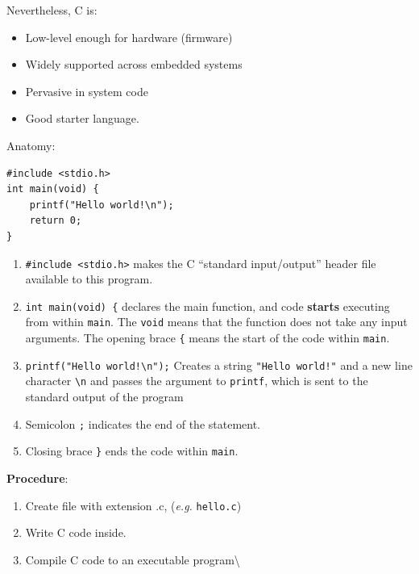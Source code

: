 \documentclass[11pt,a4paper]{article}
\providecommand{\tightlist}{\setlength{\itemsep}{0pt}\setlength{\parskip}{0pt}}
\begin{document}
Nevertheless, C is:

\begin{itemize}
\tightlist
\item
  Low-level enough for hardware (firmware)
\item
  Widely supported across embedded systems
\item
  Pervasive in system code
\item
  Good starter language.
\end{itemize}

\label{01-basic-program}
\hypertarget{01-basic-program}{}

Anatomy:

\begin{lstlisting}[style=cscode]
#include <stdio.h>
int main(void) {
    printf("Hello world!\n");
    return 0;
}
\end{lstlisting}

\begin{enumerate}
\def\labelenumi{\arabic{enumi}.}
\tightlist
\item
  \texttt{\#include\ \textless{}stdio.h\textgreater{}} makes the C ``standard input/output'' header file available to this program.
\item
  \texttt{int\ main(void)\ \{} declares the main function, and code \textbf{starts} executing from within \texttt{main}. The \texttt{void} means that the function does not take any input arguments. The opening brace \texttt{\{} means the start of the code within \texttt{main}.
\item
  \texttt{printf("Hello\ world!\textbackslash{}n");} Creates a string \texttt{"Hello\ world!"} and a new line character \texttt{\textbackslash{}n} and passes the argument to \texttt{printf}, which is sent to the standard output of the program
\item
  Semicolon \texttt{;} indicates the end of the statement.
\item
  Closing brace \texttt{\}} ends the code within \texttt{main}.
\end{enumerate}

\textbf{Procedure}:

\begin{enumerate}
\def\labelenumi{\arabic{enumi}.}
\tightlist
\item
  Create file with extension .c, (\emph{e.g.} \texttt{hello.c})
\item
  Write C code inside.
\item
  Compile C code to an executable program\textbackslash{}
\end{enumerate}
\end{document}
